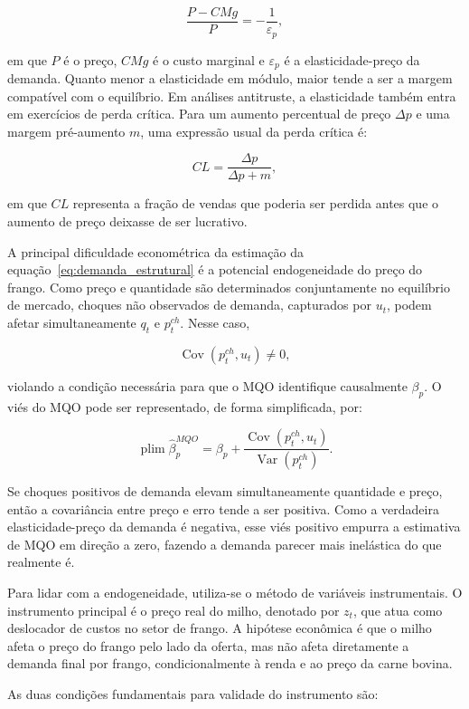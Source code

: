 \documentclass[12pt,a4paper]{article}
\begin{document}
\[
\frac{P - CMg}{P}
=
-\frac{1}{\varepsilon_p},
\tag{2}
\label{eq:lerner}
\]

em que \(P\) é o preço, \(CMg\) é o custo marginal e \(\varepsilon_p\) é a elasticidade-preço da demanda. Quanto menor a elasticidade em módulo, maior tende a ser a margem compatível com o equilíbrio. Em análises antitruste, a elasticidade também entra em exercícios de perda crítica. Para um aumento percentual de preço \(\Delta p\) e uma margem pré-aumento \(m\), uma expressão usual da perda crítica é:

\[
CL
=
\frac{\Delta p}{\Delta p + m},
\tag{3}
\label{eq:critical_loss}
\]

em que \(CL\) representa a fração de vendas que poderia ser perdida antes que o aumento de preço deixasse de ser lucrativo.

A principal dificuldade econométrica da estimação da equação~\eqref{eq:demanda_estrutural} é a potencial endogeneidade do preço do frango. Como preço e quantidade são determinados conjuntamente no equilíbrio de mercado, choques não observados de demanda, capturados por \(u_t\), podem afetar simultaneamente \(q_t\) e \(p^{ch}_t\). Nesse caso,

\[
\operatorname{Cov}(p^{ch}_t,u_t)\neq 0,
\tag{4}
\label{eq:endogeneidade}
\]

violando a condição necessária para que o MQO identifique causalmente \(\beta_p\). O viés do MQO pode ser representado, de forma simplificada, por:

\[
\operatorname{plim}\hat{\beta}^{MQO}_p
=
\beta_p
+
\frac{\operatorname{Cov}(p^{ch}_t,u_t)}
{\operatorname{Var}(p^{ch}_t)}.
\tag{5}
\label{eq:vies_mqo}
\]

Se choques positivos de demanda elevam simultaneamente quantidade e preço, então a covariância entre preço e erro tende a ser positiva. Como a verdadeira elasticidade-preço da demanda é negativa, esse viés positivo empurra a estimativa de MQO em direção a zero, fazendo a demanda parecer mais inelástica do que realmente é.

Para lidar com a endogeneidade, utiliza-se o método de variáveis instrumentais. O instrumento principal é o preço real do milho, denotado por \(z_t\), que atua como deslocador de custos no setor de frango. A hipótese econômica é que o milho afeta o preço do frango pelo lado da oferta, mas não afeta diretamente a demanda final por frango, condicionalmente à renda e ao preço da carne bovina.

As duas condições fundamentais para validade do instrumento são:
\end{document}
